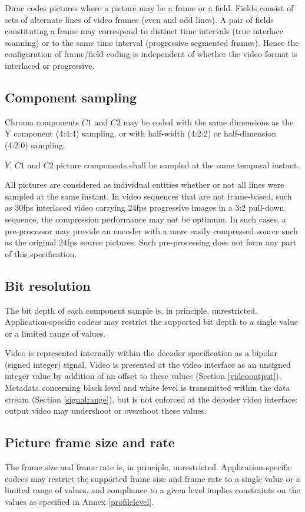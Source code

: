 Dirac codes pictures where a picture may be a frame or a field. Fields consist 
of sets of alternate lines of video frames (even and odd lines). A pair of 
fields constituting a frame may correspond to distinct time intervals (true
interlace scanning) or to the same time interval (progressive segmented frames).
 Hence the configuration of frame/field coding is independent of whether the 
video format is interlaced or progressive.

\subsection{Component sampling}

Chroma components $C1$ and $C2$ may be coded with the same dimensions as the Y
 component (4:4:4) sampling, or with half-width (4:2:2) or half-dimension 
(4:2:0) sampling.

$Y$, $C1$ and $C2$ picture components shall be sampled at the same temporal
instant.

\begin{informative}
All pictures are considered as individual entities whether or not all lines were
 sampled at the same instant. In video sequences that are not frame-based, such 
as 30fps interlaced video carrying 24fps progressive images in a 3:2 
pull-down sequence, the compression performance may not be optimum. In such 
cases, a pre-processor may provide an encoder with a more easily compressed 
source such as the original 24fps source pictures. Such pre-processing does not form any part of this specification.
\end{informative}

\subsection{Bit resolution}

The bit depth of each component sample is, in principle, unrestricted. 
Application-specific codecs may restrict the supported bit depth to a single 
value or a limited range of values.

Video is represented internally within the decoder specification as a bipolar
 (signed integer) signal. Video is presented at the video interface as an 
unsigned integer value by addition of an offset to these values 
(Section \ref{videooutput}). Metadata concerning black level and white level 
is transmitted
 within the data stream (Section \ref{signalrange}), but is not enforced at the
decoder video interface: output video may undershoot or overshoot these values.

\subsection{Picture frame size and rate}

The frame size and frame rate is, in principle, unrestricted. 
Application-specific codecs may restrict the supported frame size and frame rate
 to a single value or a limited range of values, and compliance to a given level
 implies constraints on the values as specified in Annex \ref{profilelevel}.

